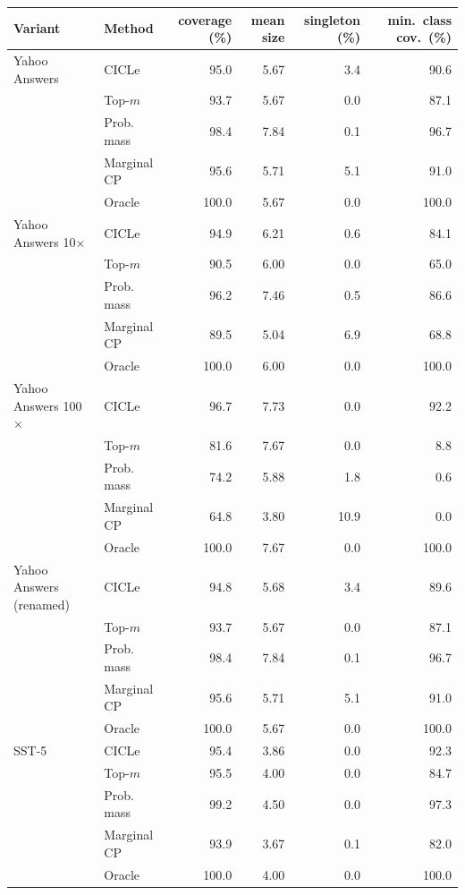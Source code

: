 \begin{tabular}{llrrrr}
\toprule
Variant & Method & coverage (\%) & mean size & singleton (\%) & min.\ class cov.\ (\%) \\
\midrule
Yahoo Answers & CICLe & 95.0 & 5.67 & 3.4 & 90.6 \\
 & Top-$m$ & 93.7 & 5.67 & 0.0 & 87.1 \\
 & Prob. mass & 98.4 & 7.84 & 0.1 & 96.7 \\
 & Marginal CP & 95.6 & 5.71 & 5.1 & 91.0 \\
 & Oracle & 100.0 & 5.67 & 0.0 & 100.0 \\
\addlinespace
Yahoo Answers 10$\times$ & CICLe & 94.9 & 6.21 & 0.6 & 84.1 \\
 & Top-$m$ & 90.5 & 6.00 & 0.0 & 65.0 \\
 & Prob. mass & 96.2 & 7.46 & 0.5 & 86.6 \\
 & Marginal CP & 89.5 & 5.04 & 6.9 & 68.8 \\
 & Oracle & 100.0 & 6.00 & 0.0 & 100.0 \\
\addlinespace
Yahoo Answers 100$\times$ & CICLe & 96.7 & 7.73 & 0.0 & 92.2 \\
 & Top-$m$ & 81.6 & 7.67 & 0.0 & 8.8 \\
 & Prob. mass & 74.2 & 5.88 & 1.8 & 0.6 \\
 & Marginal CP & 64.8 & 3.80 & 10.9 & 0.0 \\
 & Oracle & 100.0 & 7.67 & 0.0 & 100.0 \\
\addlinespace
Yahoo Answers (renamed) & CICLe & 94.8 & 5.68 & 3.4 & 89.6 \\
 & Top-$m$ & 93.7 & 5.67 & 0.0 & 87.1 \\
 & Prob. mass & 98.4 & 7.84 & 0.1 & 96.7 \\
 & Marginal CP & 95.6 & 5.71 & 5.1 & 91.0 \\
 & Oracle & 100.0 & 5.67 & 0.0 & 100.0 \\
\addlinespace
SST-5 & CICLe & 95.4 & 3.86 & 0.0 & 92.3 \\
 & Top-$m$ & 95.5 & 4.00 & 0.0 & 84.7 \\
 & Prob. mass & 99.2 & 4.50 & 0.0 & 97.3 \\
 & Marginal CP & 93.9 & 3.67 & 0.1 & 82.0 \\
 & Oracle & 100.0 & 4.00 & 0.0 & 100.0 \\

\end{tabular}
